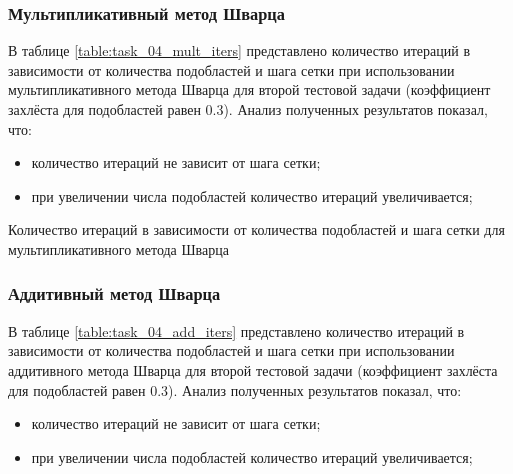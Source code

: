 \documentclass[a4paper]{article}
\begin{document}
\newpage

\subsubsection{Мультипликативный метод Шварца}

В таблице \ref{table:task_04_mult_iters} представлено количество итераций в зависимости от количества подобластей и шага сетки при использовании мультипликативного метода Шварца для второй тестовой задачи (коэффициент захлёста для подобластей равен 0.3). Анализ полученных результатов показал, что:
\begin{itemize}
\item количество итераций не зависит от шага сетки;
\item при увеличении числа подобластей количество итераций увеличивается;
\end{itemize}

\begin{table}[h]
\caption{Количество итераций в зависимости от количества подобластей и шага сетки для мультипликативного метода Шварца}
\label{table:task_04_mult_iters}
\end{table}

\subsubsection{Аддитивный метод Шварца}

В таблице \ref{table:task_04_add_iters} представлено количество итераций в зависимости от количества подобластей и шага сетки при использовании аддитивного метода Шварца для второй тестовой задачи (коэффициент захлёста для подобластей равен 0.3). Анализ полученных результатов показал, что:
\begin{itemize}
\item количество итераций не зависит от шага сетки;
\item при увеличении числа подобластей количество итераций увеличивается;
\end{itemize}
\end{document}

